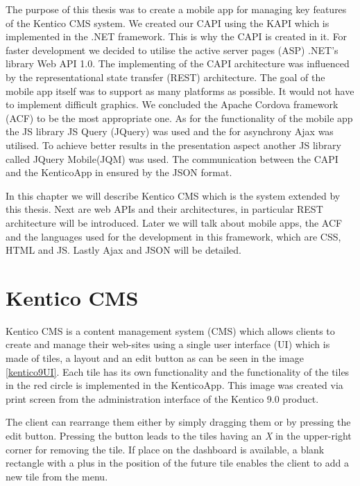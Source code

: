 The purpose of this thesis was to create a mobile app for managing key features of the Kentico CMS system. We created our CAPI using the KAPI which is implemented in the .NET framework. This is why the CAPI is created in it. For faster development we decided to utilise the active server pages (ASP) .NET's library Web API 1.0. The implementing of the CAPI architecture was influenced by the representational state transfer (REST) architecture. The goal of the mobile app itself was to support as many platforms as possible. It would not have to implement difficult graphics. We concluded the Apache Cordova framework (ACF) to be the most appropriate one. As for the functionality of the mobile app the JS library JS Query (JQuery) was used and the for asynchrony Ajax was utilised. To achieve better results in the presentation aspect another JS library called JQuery Mobile(JQM) was used. The communication between the CAPI and the KenticoApp in ensured by the JSON format.

In this chapter we will describe Kentico CMS which is the system extended by this thesis. Next are web APIs and their architectures, in particular REST architecture will be introduced. Later we will talk about mobile apps, the ACF and the languages used for the development in this framework, which are CSS, HTML and JS. Lastly Ajax and JSON will be detailed. 
\section{Kentico CMS} \label{analysisKenticoCMS}
Kentico CMS \cite{kentico-product-overview} is a content management system (CMS) which allows clients to create and manage their web-sites using a single user interface (UI) which is made of tiles, a layout and an edit button as can be seen in the image \ref{kentico9UI}. Each tile has its own functionality and the functionality of the tiles in the red circle is implemented in the KenticoApp. This image was created via print screen from the administration interface of the Kentico 9.0 product.

The client can rearrange them either by simply dragging them or by pressing the edit button. Pressing the button leads to the tiles having an \textit{X} in the upper-right corner for removing the tile. If place on the dashboard is available, a blank rectangle with a plus in the position of the future tile enables the client to add a new tile from the menu. 

